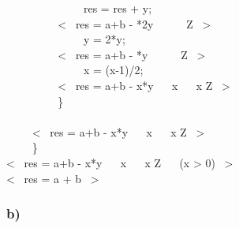 \documentclass[a4paper]{article}
\begin{document}
~~~~ ~~~~ ~~~~ res = res + y; \\
~~~~ ~~~~ <~ res = a+b - *2y ~\land~   ~\land~  \in \mathbb Z ~> \\
~~~~ ~~~~ ~~~~ y = 2*y; \\
~~~~ ~~~~ <~ res = a+b - *y ~\land~   ~\land~  \in \mathbb Z ~> \\
~~~~ ~~~~ ~~~~ x = (x-1)/2; \\
~~~~ ~~~~ <~ res = a+b - x*y ~\land~ x  ~\land~ x \in \mathbb Z ~> \\
~~~~ ~~~~ \} \\
\\
~~~~ <~ res = a+b - x*y ~\land~ x  ~\land~ x \in \mathbb Z ~> \\
~~~~ \} \\
<~ res = a+b - x*y ~\land~ x  ~\land~ x \in \mathbb Z ~\land~ \neg (x > 0) ~> \\
<~ res = a + b ~> \\
\)


\pagebreak

\subsubsection*{ b) }
\end{document}
